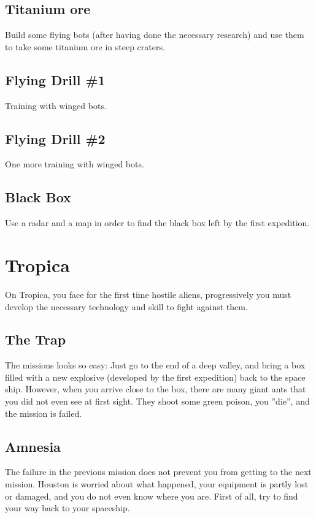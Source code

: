 \subsection{Titanium ore}

Build some flying bots (after having done the necessary research) and use them to take some titanium ore in steep craters.


\subsection{Flying Drill \#1}

Training with winged bots.


\subsection{Flying Drill \#2}

One more training with winged bots.


\subsection{Black Box}

Use a radar and a map in order to find the black box left by the first expedition.


\section{Tropica}

On Tropica, you face for the first time hostile aliens, progressively you must develop the necessary technology and skill to fight against them.


\subsection{The Trap}

The missions looks so easy: Just go to the end of a deep valley, and bring a box filled with a new explosive (developed by the first expedition) back to the space ship. However, when you arrive close to the box, there are many giant ants that you did not even see at first sight. They shoot some green poison, you ''die'', and the mission is failed.


\subsection{Amnesia}

The failure in the previous mission does not prevent you from getting to the next mission. Houston is worried about what happened, your equipment is partly lost or damaged, and you do not even know where you are. First of all, try to find your way back to your spaceship.



